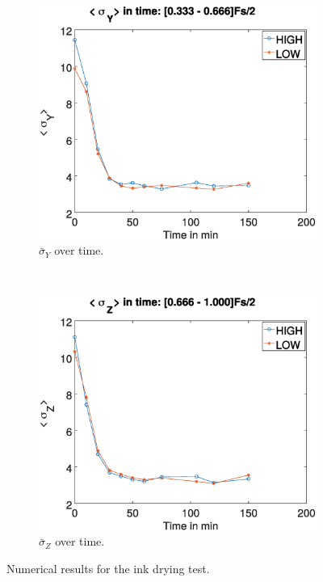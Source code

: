 \documentclass[review]{elsarticle}
\begin{document}
\begin{figure}[h!]
\begin{subfigure}[b]{0.475\textwidth}
    \end{subfigure}
    ~\\ 
    \begin{subfigure}[b]{0.475\textwidth}
        \includegraphics[width=\textwidth]{std-bandy.eps}
	\caption{$\bar{\sigma}_Y$ over time.}
        \label{fig:stdyink}
    \end{subfigure}
  ~
    \begin{subfigure}[b]{0.475\textwidth}
        \includegraphics[width=\textwidth]{std-bandz.eps}
	\caption{$\bar{\sigma}_Z$ over time.}
        \label{fig:stdzink}
    \end{subfigure}
    
\caption{Numerical results for the ink drying test.}\label{fig:numerical}
\end{figure}
\end{document}
